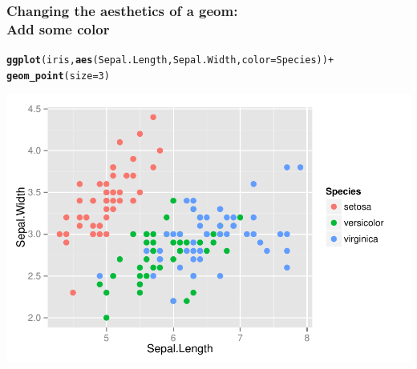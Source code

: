 \documentclass{beamer}\usepackage[]{graphicx}\usepackage[]{color}
\makeatletter
\newcommand{\hlnum}[1]{\textcolor[rgb]{0.686,0.059,0.569}{#1}}%
\newcommand{\hlopt}[1]{\textcolor[rgb]{0,0,0}{#1}}%
\newcommand{\hlstd}[1]{\textcolor[rgb]{0.345,0.345,0.345}{#1}}%
\newcommand{\hlkwc}[1]{\textcolor[rgb]{0.333,0.667,0.333}{#1}}%
\newcommand{\hlkwd}[1]{\textcolor[rgb]{0.737,0.353,0.396}{\textbf{#1}}}%
\newenvironment{kframe}{%
 \def\at@end@of@kframe{}%
 \ifinner\ifhmode%
  \def\at@end@of@kframe{\end{minipage}}%
  \begin{minipage}{\columnwidth}%
 \fi\fi%
 \def\FrameCommand##1{\hskip\@totalleftmargin \hskip-\fboxsep
 \colorbox{shadecolor}{##1}\hskip-\fboxsep
     \hskip-\linewidth \hskip-\@totalleftmargin \hskip\columnwidth}%
 \MakeFramed {\advance\hsize-\width
   \@totalleftmargin\z@ \linewidth\hsize
   \@setminipage}}%
 {\par\unskip\endMakeFramed%
 \at@end@of@kframe}
\newenvironment{knitrout}{}{} %
\makeatother
\begin{document}
\begin{frame}[fragile]
\frametitle{Changing the aesthetics of a geom: \\Add some color}
\begin{knitrout}\footnotesize
{}\color{fgcolor}\begin{kframe}
\begin{alltt}
\hlkwd{ggplot}\hlstd{(iris,} \hlkwd{aes}\hlstd{(Sepal.Length, Sepal.Width,} \hlkwc{color} \hlstd{= Species))} \hlopt{+}
    \hlkwd{geom_point}\hlstd{(}\hlkwc{size} \hlstd{=} \hlnum{3}\hlstd{)}
\end{alltt}
\end{kframe}

{\centering \includegraphics[width=.75\linewidth]{figure/first_plot_color_} 

}



\end{knitrout}
\end{frame}

\end{document}
